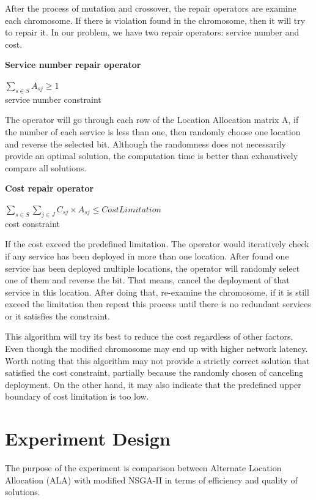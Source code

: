 \documentclass{llncs}
\begin{document}
After the process of mutation and crossover, the repair operators are examine each chromosome. 
If there is violation found in the chromosome, then it will try to repair it. 
In our problem, we have two repair operators: service number and cost.

\begin{flushleft}\textbf{Service number repair operator}\end{flushleft}
\begin{center}
		$\sum\limits_{s \in S} A_{sj} \geq 1$ \\
		service number constraint
\end{center}
The operator will go through each row of the Location Allocation matrix A, if the number of each 
service is less than one, then randomly choose one location and reverse the selected bit. 
Although the randomness does not necessarily provide an optimal solution, the computation time is 
better than exhaustively compare all solutions. 


\begin{flushleft}\textbf{Cost repair operator}\end{flushleft}
	\begin{center} 
		$\sum\limits_{s \in S} \sum\limits_{j \in J} C_{sj} \times A_{sj} \leq CostLimitation$ \\
		cost constraint
\end{center}

If the cost exceed the predefined limitation. The operator would iteratively check if any service has 
been deployed in more than one location. After found one service has been deployed multiple locations, 
the operator will randomly select one of them and reverse the bit. That means, cancel the deployment of 
that service in this location. After doing that, re-examine the chromosome, if it is still exceed the 
limitation then repeat this process until there is no redundant services or it satisfies the constraint.

This algorithm will try its best to reduce the cost regardless of other factors. Even though the modified 
chromosome may end up with higher network latency.
Worth noting that this algorithm may not provide a strictly correct solution that satisfied the cost constraint, 
partially because the randomly chosen of canceling deployment. On the other hand, it may also indicate that 
the predefined upper boundary of cost limitation is too low.

\section{Experiment Design}
The purpose of the experiment is comparison between Alternate Location Allocation (ALA) with modified NSGA-II in terms of efficiency and quality of solutions. 
\end{document}
